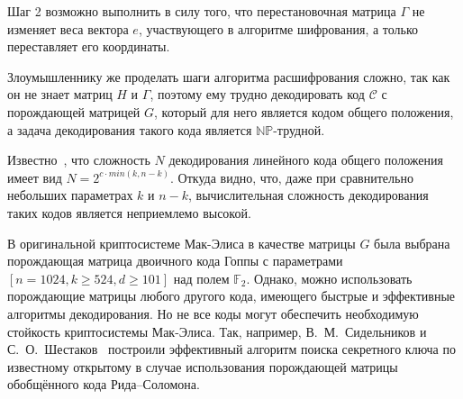 Шаг 2 возможно выполнить в силу того, что перестановочная матрица
$\Gamma$ не изменяет веса вектора $e$, участвующего в алгоритме
шифрования, а только переставляет его координаты.

Злоумышленнику же  проделать шаги алгоритма расшифрования сложно,
так как он не знает матриц $H$ и $\Gamma$, поэтому ему трудно
декодировать код $\mathcal C$ с порождающей матрицей $G$, который
для него является кодом общего положения, а задача декодирования
такого кода является $\mathbf{\mathbb {NP}}$-трудной.

Известно~\cite{Evseev, Kruk}, что сложность $N$ декодирования
линейного кода общего положения имеет вид $N=2^{c\cdot
min(k,n-k)}.$ Откуда видно, что, даже при сравнительно небольших
параметрах $k\text{ и }n-k$, вычислительная сложность
декодирования таких кодов является неприемлемо высокой.

В оригинальной криптосистеме Мак-Элиса в качестве матрицы $G$ была
выбрана порождающая матрица двоичного кода Гоппы с параметрами
$[n=1024,k\ge 524,d\ge 101]$ над полем $\mathbb F_2$. Однако,
можно использовать порождающие матрицы любого другого кода,
имеющего быстрые и эффективные алгоритмы декодирования. Но не все
коды могут обеспечить необходимую стойкость криптосистемы
Мак-Элиса. Так, например, В.~М.~Сидельников и
С.~О.~Шестаков~\cite{Sidelnikov3} построили эффективный алгоритм
поиска секретного ключа по известному открытому в случае
использования порождающей матрицы обобщённого кода Рида--Соломона.
